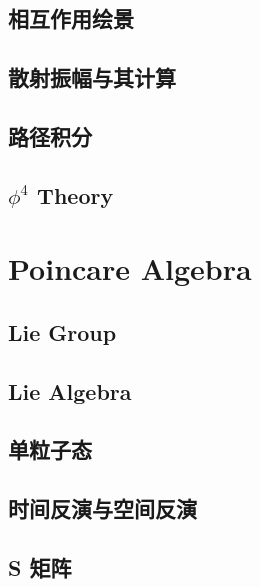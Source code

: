 \documentclass{article}
\begin{document}
\subsection{相互作用绘景}







\subsection{散射振幅与其计算}


\subsection{路径积分}



\subsection{$\phi^4$ Theory}


\section{Poincare Algebra}


\subsection{Lie Group}



\subsection{Lie Algebra}



\subsection{单粒子态}




\subsection{时间反演与空间反演}




\subsection{S 矩阵}
\end{document}
